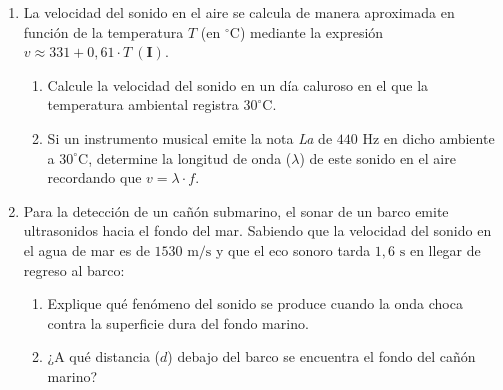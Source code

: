 \documentclass[11pt, letterpaper]{article}
\newif\ifshowanswers
\newcommand{\answer}[1]{%
	\ifshowanswers
	\par\vspace{0.15cm}
	\begin{tcolorbox}[colback=blue!5!white, colframe=blue!60!white, arc=1mm, boxrule=0.5pt, title=\textbf{\footnotesize SOLUCIÓN PASO A PASO (DOCENTE)}]
		\color{blue!80!black}\footnotesize #1
	\end{tcolorbox}
	\par\vspace{0.15cm}
	\else
	\par\vspace{0.3cm}
	\fi
}
\begin{document}
\begin{enumerate}[leftmargin=*, itemsep=0.8cm]
		\item  La velocidad del sonido en el aire se calcula de manera aproximada en función de la temperatura $T$ (en $^\circ\text{C}$) mediante la expresión $v \approx 331 + 0,61 \cdot T \ \mathbf{(I)}$.
		\begin{enumerate}[label=\alph*), itemsep=0.2cm]
			\item Calcule la velocidad del sonido en un día caluroso en el que la temperatura ambiental registra $30^\circ\text{C}$.
			\item Si un instrumento musical emite la nota \textit{La} de $440\text{ Hz}$ en dicho ambiente a $30^\circ\text{C}$, determine la longitud de onda ($\lambda$) de este sonido en el aire recordando que $v = \lambda \cdot f$.
		\end{enumerate}
		\answer{
			\textbf{a) Cálculo de la velocidad a $T = 30^\circ\text{C}$ con la ecuación (I):}
			\[ v \approx 331 + 0,61 \cdot (30) = 331 + 18,3 = \mathbf{349,3\text{ m/s}} \]
			\textbf{b) Longitud de onda despejada de $v = \lambda \cdot f$:}
			\[ \lambda = \frac{v}{f} = \frac{349,3\text{ m/s}}{440\text{ Hz}} \approx \mathbf{0,794\text{ m}} \ (\mathbf{79,4\text{ cm}}) \]
		}
		
		\item  Para la detección de un cañón submarino, el sonar de un barco emite ultrasonidos hacia el fondo del mar. Sabiendo que la velocidad del sonido en el agua de mar es de $1530\text{ m/s}$ y que el eco sonoro tarda $1,6\text{ s}$ en llegar de regreso al barco:
		\begin{enumerate}[label=\alph*), itemsep=0.2cm]
			\item Explique qué fenómeno del sonido se produce cuando la onda choca contra la superficie dura del fondo marino.
			\item ¿A qué distancia ($d$) debajo del barco se encuentra el fondo del cañón marino?
		\end{enumerate}
		\answer{
			\textbf{a) Fenómeno del sonido:} Se produce la \textbf{reflexión del sonido}, en la cual la onda sonora choca contra una superficie dura y se refleja produciendo el eco.\\[0.1cm]
			\textbf{b) Cálculo de la distancia ($d$):} El tiempo de $1,6\text{ s}$ corresponde al recorrido de ida y vuelta del pulso sonoro, por lo que el tiempo de bajada hasta el fondo es la mitad: $t = \frac{1,6\text{ s}}{2} = 0,8\text{ s}$. Despejando de $v = \frac{d}{t}$:
			\[ d = v \cdot t = (1530\text{ m/s}) \cdot (0,8\text{ s}) = \mathbf{1224,0\text{ m}} \]
		}
		

\end{enumerate}
\end{document}

